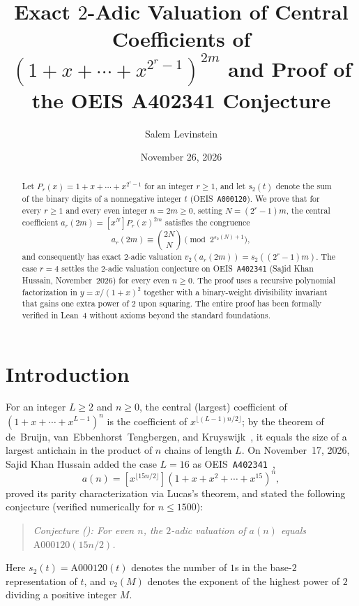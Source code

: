 \documentclass[11pt]{article}
\title{Exact $2$-Adic Valuation of Central Coefficients of $(1 + x + \cdots + x^{2^r - 1})^{2m}$ and Proof of the OEIS A402341 Conjecture}
\author{Salem Levinstein}
\date{November 26, 2026}
\theoremstyle{remark}
\begin{document}
\maketitle

\begin{abstract}
Let $P_r(x) = 1 + x + \cdots + x^{2^r - 1}$ for an integer $r \ge 1$, and let $s_2(t)$ denote the sum of the binary digits of a nonnegative integer $t$ (OEIS~\texttt{A000120}). We prove that for every $r \ge 1$ and every even integer $n = 2m \ge 0$, setting $N = (2^r - 1)m$, the central coefficient $a_r(2m) = [x^N] P_r(x)^{2m}$ satisfies the congruence
\[
  a_r(2m) \equiv \binom{2N}{N} \pmod{2^{s_2(N) + 1}},
\]
and consequently has exact $2$-adic valuation $v_2(a_r(2m)) = s_2((2^r - 1)m)$. The case $r = 4$ settles the $2$-adic valuation conjecture on OEIS~\texttt{A402341} (Sajid Khan Hussain, November~2026) for every even $n \ge 0$. The proof uses a recursive polynomial factorization in $y = x/(1+x)^2$ together with a binary-weight divisibility invariant that gains one extra power of $2$ upon squaring. The entire proof has been formally verified in Lean~4 without axioms beyond the standard foundations.
\end{abstract}

\section{Introduction}

For an integer $L \ge 2$ and $n \ge 0$, the central (largest) coefficient of $(1 + x + \cdots + x^{L-1})^n$ is the coefficient of $x^{\lfloor (L-1)n/2 \rfloor}$; by the theorem of de~Bruijn, van~Ebbenhorst~Tengbergen, and Kruyswijk~\cite{dBTK1951}, it equals the size of a largest antichain in the product of $n$ chains of length $L$. On November~17, 2026, Sajid Khan Hussain added the case $L = 16$ as OEIS~\texttt{A402341}~\cite{OEIS-A402341},
\[
  a(n) = [x^{\lfloor 15n/2 \rfloor}] (1 + x + x^2 + \cdots + x^{15})^n,
\]
proved its parity characterization via Lucas's theorem, and stated the following conjecture (verified numerically for $n \le 1500$):

\begin{quote}
\emph{Conjecture (\cite{OEIS-A402341}): For even $n$, the $2$-adic valuation of $a(n)$ equals $\mathrm{A000120}(15n/2)$.}
\end{quote}

Here $s_2(t) = \mathrm{A000120}(t)$ denotes the number of $1$s in the base-$2$ representation of $t$, and $v_2(M)$ denotes the exponent of the highest power of $2$ dividing a positive integer $M$.
\end{document}
